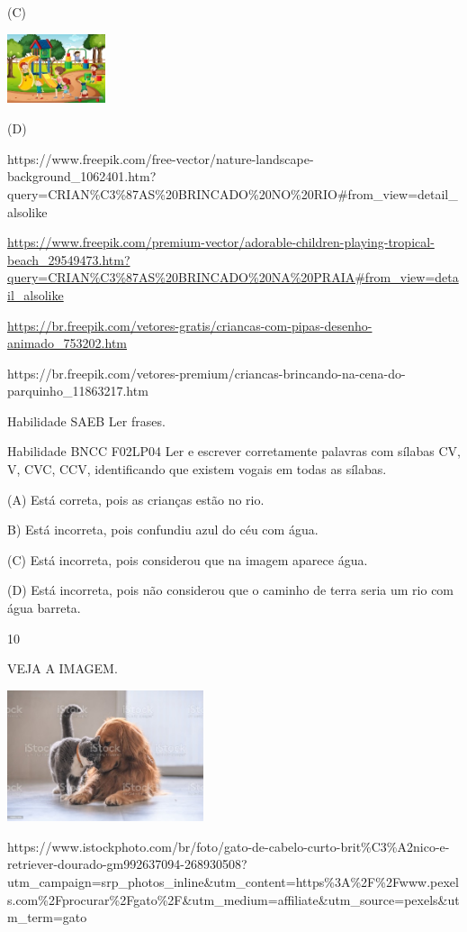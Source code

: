 {{{{{{(C)

\includegraphics[width=1.13611in,height=0.80208in]{media/image157.jpeg}

(D)

https://www.freepik.com/free-vector/nature-landscape-background\_1062401.htm?query=CRIAN\%C3\%87AS\%20BRINCADO\%20NO\%20RIO\#from\_view=detail\_alsolike

\url{https://www.freepik.com/premium-vector/adorable-children-playing-tropical-beach_29549473.htm?query=CRIAN\%C3\%87AS\%20BRINCADO\%20NA\%20PRAIA\#from_view=detail_alsolike}

\url{https://br.freepik.com/vetores-gratis/criancas-com-pipas-desenho-animado_753202.htm}

https://br.freepik.com/vetores-premium/criancas-brincando-na-cena-do-parquinho\_11863217.htm

Habilidade SAEB Ler frases.

Habilidade BNCC F02LP04 Ler e escrever corretamente palavras com sílabas
CV, V, CVC, CCV, identificando que existem vogais em todas as sílabas.

(A) Está correta, pois as crianças estão no rio.

B) Está incorreta, pois confundiu azul do céu com água.

(C) Está incorreta, pois considerou que na imagem aparece água.

(D) Está incorreta, pois não considerou que o caminho de terra seria um
rio com água barreta.

\num{10}

VEJA A IMAGEM.

\includegraphics[width=2.27539in,height=1.51515in]{media/image158.jpeg}

https://www.istockphoto.com/br/foto/gato-de-cabelo-curto-brit\%C3\%A2nico-e-retriever-dourado-gm992637094-268930508?utm\_campaign=srp\_photos\_inline\&utm\_content=https\%3A\%2F\%2Fwww.pexels.com\%2Fprocurar\%2Fgato\%2F\&utm\_medium=affiliate\&utm\_source=pexels\&utm\_term=gato

}}}}}}
